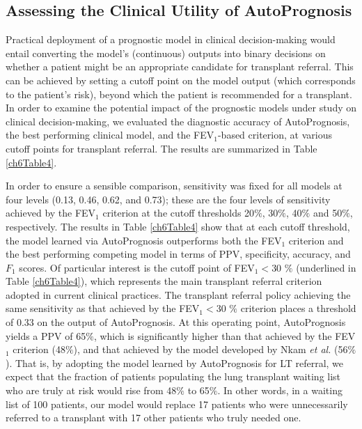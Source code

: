\documentclass [PhD] {uclathes}
\begin{document}
\subsection{Assessing the Clinical Utility of AutoPrognosis} 

Practical deployment of a prognostic model in clinical decision-making would entail converting the model's (continuous) outputs into binary decisions on whether a patient might be an appropriate candidate for transplant referral\cite{mayer2002developing}. This can be achieved by setting a cutoff point on the model output (which corresponds to the patient's risk), beyond which the patient is recommended for a transplant. In order to examine the potential impact of the prognostic models under study on clinical decision-making, we evaluated the diagnostic accuracy of AutoPrognosis, the best performing clinical model, and the FEV$_1$-based criterion, at various cutoff points for transplant referral. The results are summarized in Table \ref{ch6Table4}.

In order to ensure a sensible comparison, sensitivity was fixed for all models at four levels (0.13, 0.46, 0.62, and 0.73); these are the four levels of sensitivity achieved by the FEV$_1$ criterion at the cutoff thresholds 20$\%$, 30$\%$, 40$\%$ and 50$\%$, respectively. The results in Table \ref{ch6Table4} show that at each cutoff threshold, the model learned via AutoPrognosis outperforms both the FEV$_1$ criterion and the best performing competing model in terms of PPV, specificity, accuracy, and $F_1$ scores. Of particular interest is the cutoff point of FEV$_1<$30 $\%$ (underlined in Table \ref{ch6Table4}), which represents the main transplant referral criterion adopted in current clinical practices. The transplant referral policy achieving the same sensitivity as that achieved by the FEV$_1<$30 $\%$ criterion places a threshold of 0.33 on the output of AutoPrognosis. At this operating point, AutoPrognosis yields a PPV of 65$\%$, which is significantly higher than that achieved by the FEV$_1$ criterion (48$\%$), and that achieved by the model developed by Nkam {\it et al.} \cite{nkam20173} (56$\%$). That is, by adopting the model learned by AutoPrognosis for LT referral, we expect that the fraction of patients populating the lung transplant waiting list who are truly at risk would rise from 48$\%$ to 65$\%$. In other words, in a waiting list of 100 patients, our model would replace 17 patients who were unnecessarily referred to a transplant with 17 other patients who truly needed one.
\end{document}
